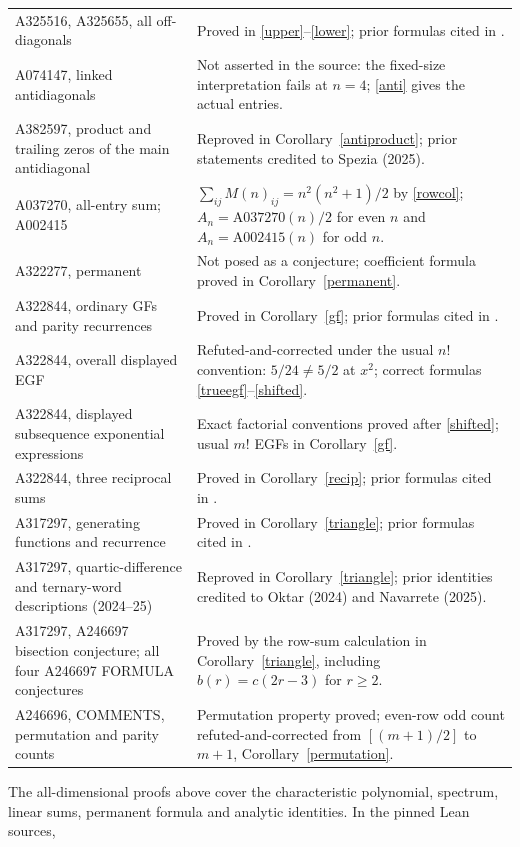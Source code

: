 \documentclass[11pt]{article}
\begin{document}
{\begin{longtable}{@{}p{.43\linewidth}p{.52\linewidth}@{}}
A325516, A325655, all off-diagonals&Proved in \eqref{upper}--\eqref{lower}; prior formulas cited in \cite{diagonals}.\\
A074147, linked antidiagonals&Not asserted in the source: the fixed-size interpretation fails at $n=4$; \eqref{anti} gives the actual entries.\\
A382597, product and trailing zeros of the main antidiagonal&Reproved in Corollary~\ref{antiproduct}; prior statements credited to Spezia (2025).\\
A037270, all-entry sum; A002415&$\sum_{ij}M(n)_{ij}=n^2(n^2+1)/2$ by \eqref{rowcol}; $A_n=\text{A037270}(n)/2$ for even $n$ and $A_n=\text{A002415}(n)$ for odd $n$.\\
A322277, permanent&Not posed as a conjecture; coefficient formula proved in Corollary~\ref{permanent}.\\
A322844, ordinary GFs and parity recurrences&Proved in Corollary~\ref{gf}; prior formulas cited in \cite{posing}.\\
A322844, overall displayed EGF&Refuted-and-corrected under the usual $n!$ convention: $5/24\ne5/2$ at $x^2$; correct formulas \eqref{trueegf}--\eqref{shifted}.\\
A322844, displayed subsequence exponential expressions&Exact factorial conventions proved after \eqref{shifted}; usual $m!$ EGFs in Corollary~\ref{gf}.\\
A322844, three reciprocal sums&Proved in Corollary~\ref{recip}; prior formulas cited in \cite{posing}.\\
A317297, generating functions and recurrence&Proved in Corollary~\ref{triangle}; prior formulas cited in \cite{eigen}.\\
A317297, quartic-difference and ternary-word descriptions (2024--25)&Reproved in Corollary~\ref{triangle}; prior identities credited to Oktar (2024) and Navarrete (2025).\\
A317297, A246697 bisection conjecture; all four A246697 FORMULA conjectures&Proved by the row-sum calculation in Corollary~\ref{triangle}, including $b(r)=c(2r-3)$ for $r\geq2$.\\
A246696, COMMENTS, permutation and parity counts&Permutation property proved; even-row odd count refuted-and-corrected from $[(m+1)/2]$ to $m+1$, Corollary~\ref{permutation}.\\
\bottomrule
\end{longtable}}
The all-dimensional proofs above cover the characteristic polynomial,
spectrum, linear sums, permanent formula and analytic identities.
In the pinned Lean sources,
\end{document}
